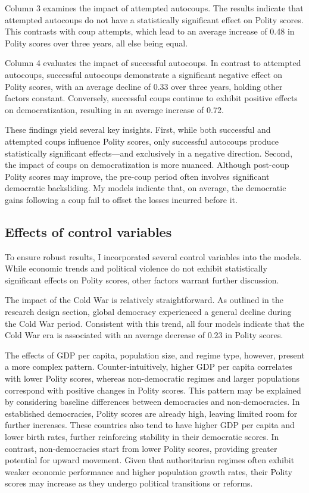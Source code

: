 \documentclass[
  12pt,
]{report}
\begin{document}
Column 3 examines the impact of attempted autocoups. The results
indicate that attempted autocoups do not have a statistically
significant effect on Polity scores. This contrasts with coup attempts,
which lead to an average increase of 0.48 in Polity scores over three
years, all else being equal.

Column 4 evaluates the impact of successful autocoups. In contrast to
attempted autocoups, successful autocoups demonstrate a significant
negative effect on Polity scores, with an average decline of 0.33 over
three years, holding other factors constant. Conversely, successful
coups continue to exhibit positive effects on democratization, resulting
in an average increase of 0.72.

These findings yield several key insights. First, while both successful
and attempted coups influence Polity scores, only successful autocoups
produce statistically significant effects---and exclusively in a
negative direction. Second, the impact of coups on democratization is
more nuanced. Although post-coup Polity scores may improve, the pre-coup
period often involves significant democratic backsliding. My models
indicate that, on average, the democratic gains following a coup fail to
offset the losses incurred before it.

\subsection{Effects of control
variables}\label{effects-of-control-variables}

To ensure robust results, I incorporated several control variables into
the models. While economic trends and political violence do not exhibit
statistically significant effects on Polity scores, other factors
warrant further discussion.

The impact of the Cold War is relatively straightforward. As outlined in
the research design section, global democracy experienced a general
decline during the Cold War period. Consistent with this trend, all four
models indicate that the Cold War era is associated with an average
decrease of 0.23 in Polity scores.

The effects of GDP per capita, population size, and regime type,
however, present a more complex pattern. Counter-intuitively, higher GDP
per capita correlates with lower Polity scores, whereas non-democratic
regimes and larger populations correspond with positive changes in
Polity scores. This pattern may be explained by considering baseline
differences between democracies and non-democracies. In established
democracies, Polity scores are already high, leaving limited room for
further increases. These countries also tend to have higher GDP per
capita and lower birth rates, further reinforcing stability in their
democratic scores. In contrast, non-democracies start from lower Polity
scores, providing greater potential for upward movement. Given that
authoritarian regimes often exhibit weaker economic performance and
higher population growth rates, their Polity scores may increase as they
undergo political transitions or reforms.
\end{document}
